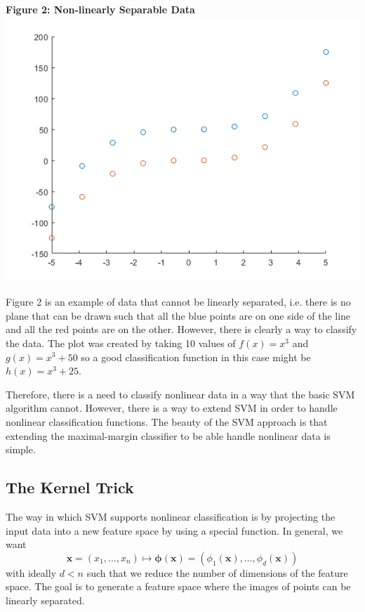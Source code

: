 \documentclass{article}
\newcommand{\bx}{\bm{x}}
\newcommand{\bphi}{\bm{\phi}}
\begin{document}
\vspace{100pt}

\begin{center}
\textbf{Figure 2: Non-linearly Separable Data}
\includegraphics[scale=0.5]{nonlinearex}
\end{center}

Figure 2 is an example of data that cannot be linearly separated, i.e. there is no plane that can be drawn such that all the blue points are on one side of the line and all the red points are on the other. However, there is clearly a way to classify the data. The plot was created by taking 10 values of $f(x) = x^3$ and $g(x) = x^3 +50$ so a good classification function in this case might be $h(x) = x^3 +25$. 

Therefore, there is a need to classify nonlinear data in a way that the basic SVM algorithm cannot. However, there is a way to extend SVM in order to handle nonlinear classification functions. The beauty of the SVM approach is that extending the maximal-margin classifier to be able handle nonlinear data is simple.

\subsection{The Kernel Trick}
The way in which SVM supports nonlinear classification is by projecting the input data into a new feature space by using a special function. In general, we want
$$ \mathbf{x} = (x_1, \dots, x_n) \mapsto \bphi(\mathbf{x}) = (\phi_1(\mathbf{x}), \dots, \phi_d(\bx))$$
with ideally $d < n$ such that we reduce the number of dimensions of the feature space. The goal is to generate a feature space where the images of points can be linearly separated.
\end{document}

